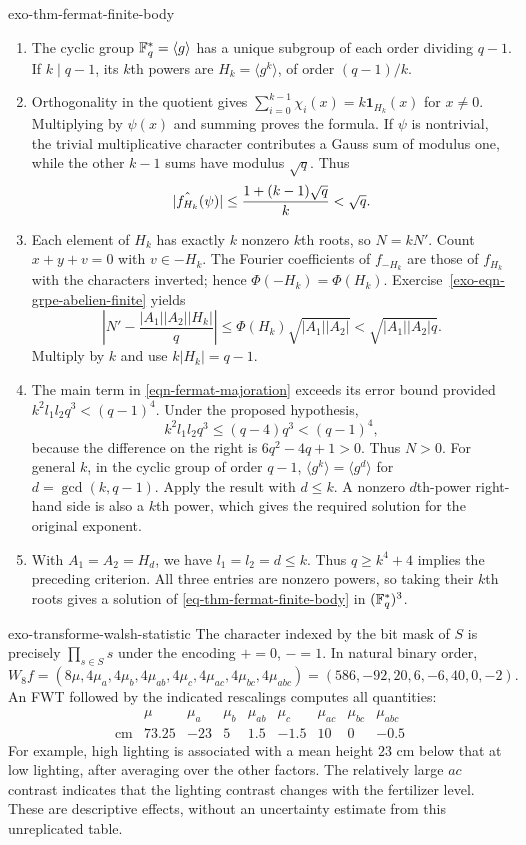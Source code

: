 \begin{correction}{exo-thm-fermat-finite-body}
\begin{enumerate}
\item The cyclic group $\mathbb{F}_q^*=\langle g\rangle$ has a unique subgroup
of each order dividing $q-1$. If $k\mid q-1$, its $k$th powers are
$H_k=\langle g^k\rangle$, of order $(q-1)/k$.
\item Orthogonality in the quotient gives
$\sum_{i=0}^{k-1}\chi_i(x)=k\mathbf1_{H_k}(x)$ for $x\neq0$.
Multiplying by $\psi(x)$ and summing proves the formula.
If $\psi$ is nontrivial, the trivial multiplicative character contributes a
Gauss sum of modulus one, while the other $k-1$ sums have modulus $\sqrt q$.
Thus
\[
 |\hat{f_{H_k}}(\psi)|\leq\frac{1+(k-1)\sqrt q}{k}<\sqrt q.
\]
\item Each element of $H_k$ has exactly $k$ nonzero $k$th roots, so
$N=kN'$. Count $x+y+v=0$ with $v\in-H_k$.
The Fourier coefficients of $f_{-H_k}$ are those of $f_{H_k}$ with the
characters inverted; hence $\Phi(-H_k)=\Phi(H_k)$.
Exercise~\ref{exo-eqn-grpe-abelien-finite} yields
\[
 \left|N'-\frac{|A_1||A_2||H_k|}{q}\right|
 \leq\Phi(H_k)\sqrt{|A_1||A_2|}<\sqrt{|A_1||A_2|q}.
\]
Multiply by $k$ and use $k|H_k|=q-1$.
\item The main term in \eqref{eqn-fermat-majoration} exceeds its error bound
provided $k^2l_1l_2q^3<(q-1)^4$.
Under the proposed hypothesis,
\[
 k^2l_1l_2q^3\leq(q-4)q^3<(q-1)^4,
\]
because the difference on the right is $6q^2-4q+1>0$.
Thus $N>0$. For general $k$, in the cyclic group of order $q-1$,
$\langle g^k\rangle=\langle g^d\rangle$ for $d=\gcd(k,q-1)$.
Apply the result with $d\leq k$. A nonzero $d$th-power right-hand side is
also a $k$th power, which gives the required solution for the original exponent.
\item With $A_1=A_2=H_d$, we have $l_1=l_2=d\leq k$.
Thus $q\geq k^4+4$ implies the preceding criterion. All three entries are
nonzero powers, so taking their $k$th roots gives a solution of
\eqref{eq-thm-fermat-finite-body} in $(\mathbb{F}_q^*)^3$.
\end{enumerate}
\end{correction}

\begin{correction}{exo-transforme-walsh-statistic}
The character indexed by the bit mask of $S$ is precisely
$\prod_{s\in S}s$ under the encoding $+=0$, $-=1$.
In natural binary order,
\[
 W_8f=(8\mu,4\mu_a,4\mu_b,4\mu_{ab},4\mu_c,4\mu_{ac},4\mu_{bc},4\mu_{abc})
     =(586,-92,20,6,-6,40,0,-2).
\]
An FWT followed by the indicated rescalings computes all quantities:
\[
\begin{array}{c|rrrrrrrr}
 &\mu&\mu_a&\mu_b&\mu_{ab}&\mu_c&\mu_{ac}&\mu_{bc}&\mu_{abc}\\\hline
 \text{cm}&73.25&-23&5&1.5&-1.5&10&0&-0.5
\end{array}
\]
For example, high lighting is associated with a mean height $23$ cm below
that at low lighting, after averaging over the other factors.
The relatively large $ac$ contrast indicates that the lighting contrast
changes with the fertilizer level. These are descriptive effects, without
an uncertainty estimate from this unreplicated table.
\end{correction}

